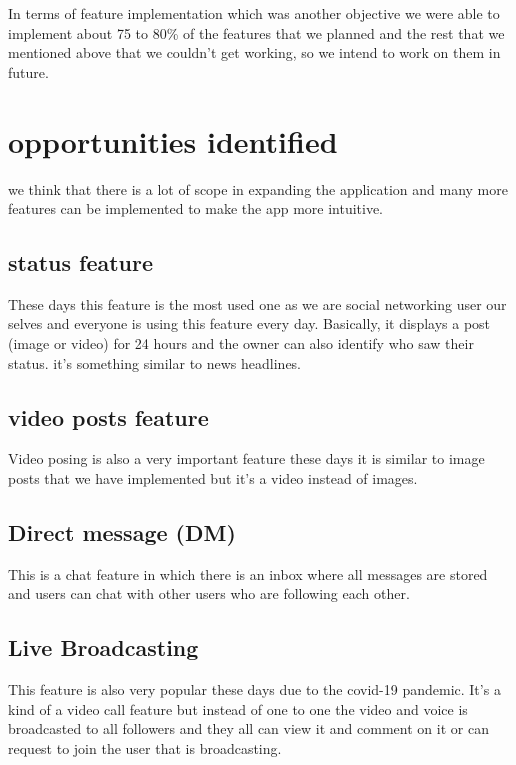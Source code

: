In terms of feature implementation which was another objective we were able to implement about 75 to 80\% of the features that we planned and the rest that we mentioned above that we couldn't get working, so we intend to work on them in future.

\section{opportunities identified}
we think that there is a lot of scope in expanding the application and many more features can be implemented to make the app more intuitive.
\subsection{status feature}
These days this feature is the most used one as we are social networking user our selves and everyone is using this feature every day. Basically, it displays a post (image or video) for 24 hours and the owner can also identify who saw their status. it's something similar to news headlines.
\subsection{video posts feature}
Video posing is also a very important feature these days it is similar to image posts that we have implemented but it's a video instead of images.
\subsection{Direct message (DM)}
This is a chat feature in which there is an inbox where all messages are stored and users can chat with other users who are following each other.
\subsection{Live Broadcasting}
This feature is also very popular these days due to the covid-19 pandemic. It's a kind of a video call feature but instead of one to one the video and voice is broadcasted to all followers and they all can view it and comment on it or can request to join the user that is broadcasting.

